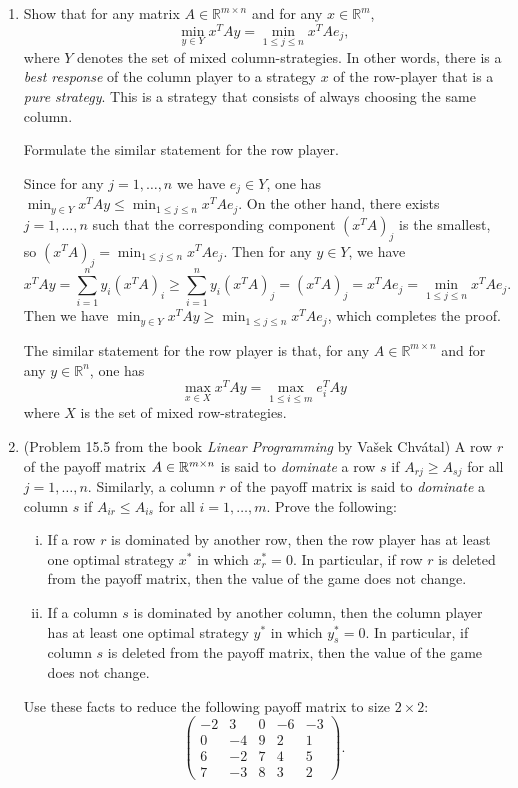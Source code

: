 \documentclass[11pt]{article}
\renewcommand{\leq}{\leqslant}
\renewcommand{\geq}{\geqslant}
\begin{document}
\begin{enumerate}[1)]
\item Show that for any matrix $A \in \mathbb{R}^{m \times n}$ and for any $x \in \mathbb{R}^m$,
\begin{displaymath}  
\min_{y\in Y} x^TA y = \min_{1≤j≤n } 
x^TAe_j,
\end{displaymath}
where $Y$ denotes the set of mixed column-strategies.
In other words, there is a \emph{best response} of the column player to a strategy $x$ of the row-player that is a \emph{pure strategy}. This is a strategy that consists of always choosing the same column.

Formulate the similar statement for the row player.  \label{ex:br} 

\begin{solution}
Since for any $j=1,\ldots,n$ we have $e_j \in Y$, one has
$\min_{y\in Y} x^TA y \leq \min_{1\leq j\leq n} x^TAe_j$.
On the other hand, there exists $j=1,\ldots,n$ such that the corresponding component $(x^TA)_j$ is the smallest, so $(x^TA)_j = \min_{1\leq j\leq n} x^TAe_j$. Then for any $y\in Y$, we have
$$x^TA y = \sum_{i=1}^n y_i (x^TA)_{i} \geq \sum_{i=1}^n y_i (x^TA)_{j} = (x^TA)_{j} = x^TAe_j = \min_{1\leq j\leq n} x^TAe_j.$$
Then we have $\min_{y\in Y} x^TA y \geq \min_{1\leq j\leq n} x^TAe_j$, which completes the proof.

The similar statement for the row player is that, for any $A \in \mathbb{R}^{m \times n}$ and for any $y \in \mathbb{R}^n$, one has 
$$\max_{x\in X} x^TA y = \max_{1\leq i \leq m} e_i^TA y$$ 
where $X$ is the set of mixed row-strategies.
\end{solution}


\item (Problem 15.5 from the book \emph{Linear Programming} by  Vašek Chvátal)
A row $r$ of the payoff matrix $A\in \mathbb{R}^{m\times n}$ is said to \emph{dominate} a row $s$ if $A_{rj} ≥ A_{sj}$ for all $j=1,\ldots,n$.
Similarly, a column $r$ of the payoff matrix is said to \emph{dominate} a column $s$ if $A_{ir} ≤ A_{is}$ for all $i=1,\ldots,m$. 
Prove the following:
\begin{enumerate}[(i)]
  \item If a row $r$ is dominated by another row, then the row player has at least one optimal strategy $x^*$ in which $x^*_r = 0$. In particular, if row $r$ is deleted from the payoff matrix, then the value of the game does not change.
  \item If a column $s$ is dominated by another column, then the column player has at least one optimal strategy $y^*$ in which $y^*_s = 0$. In particular, if column $s$ is deleted from the payoff matrix, then the value of the game does not change.
\end{enumerate}
Use these facts to reduce the following payoff matrix to size $2\times 2$:
$$\begin{pmatrix}
  -2 & 3 & 0 & -6 & -3 \\
  0 & -4 & 9 & 2 & 1 \\
  6 & -2 & 7 & 4 & 5 \\
  7 & -3 & 8 & 3 & 2 
\end{pmatrix}.
$$



\end{enumerate}
\end{document}
